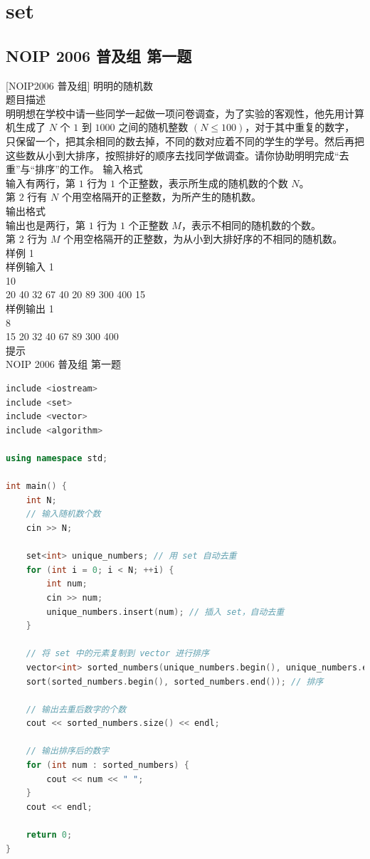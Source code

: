 \documentclass[12pt,twiside,a4paper]{ctexbook}
\numberwithin{chapter}{part}
\begin{document}
\chapter{set}
\section{NOIP 2006 普及组 第一题}
 [NOIP2006 普及组] 明明的随机数\\
 题目描述\\
明明想在学校中请一些同学一起做一项问卷调查，为了实验的客观性，他先用计算机生成了 $N$ 个 $1$ 到 $1000$ 之间的随机整数 $(N\leq100)$，对于其中重复的数字，只保留一个，把其余相同的数去掉，不同的数对应着不同的学生的学号。然后再把这些数从小到大排序，按照排好的顺序去找同学做调查。请你协助明明完成“去重”与“排序”的工作。
 输入格式\\
输入有两行，第 $1$ 行为 $1$ 个正整数，表示所生成的随机数的个数 $N$。\\
第 $2$ 行有 $N$ 个用空格隔开的正整数，为所产生的随机数。\\
 输出格式\\
输出也是两行，第 $1$ 行为 $1$ 个正整数 $M$，表示不相同的随机数的个数。\\
第 $2$ 行为 $M$ 个用空格隔开的正整数，为从小到大排好序的不相同的随机数。\\
 样例 1\\
 样例输入 1\\
10\\
20 40 32 67 40 20 89 300 400 15\\
 样例输出 1\\
8\\
15 20 32 40 67 89 300 400\\
 提示\\
NOIP 2006 普及组 第一题\\
\begin{lstlisting}[language=c++]
include <iostream>
include <set>
include <vector>
include <algorithm>

using namespace std;

int main() {
    int N;
    // 输入随机数个数
    cin >> N;

    set<int> unique_numbers; // 用 set 自动去重
    for (int i = 0; i < N; ++i) {
        int num;
        cin >> num;
        unique_numbers.insert(num); // 插入 set，自动去重
    }

    // 将 set 中的元素复制到 vector 进行排序
    vector<int> sorted_numbers(unique_numbers.begin(), unique_numbers.end());
    sort(sorted_numbers.begin(), sorted_numbers.end()); // 排序

    // 输出去重后数字的个数
    cout << sorted_numbers.size() << endl;

    // 输出排序后的数字
    for (int num : sorted_numbers) {
        cout << num << " ";
    }
    cout << endl;

    return 0;
}
\end{lstlisting}
\end{document}
